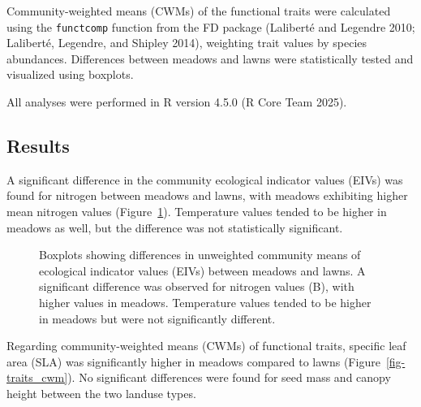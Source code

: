 \documentclass[
  12pt,
  a4paper,
  DIV=11,
  numbers=noendperiod]{scrartcl}
\begin{document}
Community-weighted means (CWMs) of the functional traits were calculated
using the \texttt{functcomp} function from the FD package (Laliberté and
Legendre 2010; Laliberté, Legendre, and Shipley 2014), weighting trait
values by species abundances. Differences between meadows and lawns were
statistically tested and visualized using boxplots.

All analyses were performed in R version 4.5.0 (R Core Team 2025).

\subsection{Results}\label{results}

A significant difference in the community ecological indicator values
(EIVs) was found for nitrogen between meadows and lawns, with meadows
exhibiting higher mean nitrogen values
(Figure~\ref{fig-eiv_unweighted}). Temperature values tended to be
higher in meadows as well, but the difference was not statistically
significant.

\begin{figure}[H]


\caption{\label{fig-eiv_unweighted}Boxplots showing differences in
unweighted community means of ecological indicator values (EIVs) between
meadows and lawns. A significant difference was observed for nitrogen
values (B), with higher values in meadows. Temperature values tended to
be higher in meadows but were not significantly different.}

\end{figure}%

Regarding community-weighted means (CWMs) of functional traits, specific
leaf area (SLA) was significantly higher in meadows compared to lawns
(Figure~\ref{fig-traits_cwm}). No significant differences were found for
seed mass and canopy height between the two landuse types.
\end{document}
